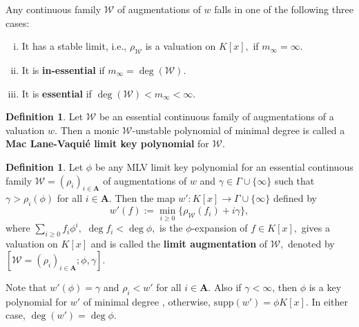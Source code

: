 \documentclass[11pt]{amsart}
\newtheorem{lemma}[theorem]{Lemma}
\theoremstyle{definition}
\newtheorem{definition}[theorem]{Definition}
\theoremstyle{remark}
\newtheorem{remark}[theorem]{Remark}
\numberwithin{equation}{section}
\begin{document}
Any continuous family $\mathcal{W}$ of augmentations of $w$ falls in one of the following three cases:
\begin{enumerate}[(i)]
	\item  It has a stable limit,  i.e., $\rho_{\mathcal{W}}$ is a valuation on $K[x],$ if $m_{\infty}=\infty.$ 
	\item It is {\bf in-essential} if $m_{\infty}=\deg(\mathcal{W}).$
	\item It is  {\bf essential }  if $\deg(\mathcal{W})<m_{\infty}<\infty.$
\end{enumerate} 
\begin{definition}
	Let $\mathcal{W}$ be an essential continuous family of augmentations of a valuation $w.$ Then a  monic $\mathcal{W}$-unstable polynomial of minimal degree  is called a {\bf Mac Lane-Vaqui\'e  limit key polynomial} for $\mathcal{W}.$
\end{definition}
%
%
%
%
%
%
\begin{definition}
	Let   $\phi$ be any MLV limit key polynomial for an essential continuous family $\mathcal{W}  =(\rho_i)_{i\in\mathbf{A}}$ of augmentations of $w$   and  $\gamma\in \Gamma\cup\{\infty\}$ such that $\gamma>\rho_i(\phi)$ for all $i\in\mathbf{A}.$ Then the map $w': K[x]\longrightarrow\Gamma\cup\{\infty\}$ defined by
	$$w'(f):=\min_{i\geq 0}\{\rho_\mathcal{W}(f_i)+i\gamma\},$$
	where  $\sum_{i\geq 0} f_i\phi^i,$ $\deg f_i<\deg \phi,$ is the $\phi$-expansion of $f\in K[x],$ gives a valuation on $K[x]$ and is called  the {\bf limit augmentation} of $\mathcal{W},$  denoted by $[\mathcal{W}=(\rho_i)_{i\in\mathbf{A}}; \phi, \gamma].$ 
\end{definition}
Note that $w'(\phi)=\gamma$ and $\rho_i<w'$ for all $i\in\mathbf{A}.$ Also if $\gamma<\infty$, then $\phi$ is a key polynomial for $w'$ of minimal degree  \cite[Proposition 3.5]{EN1}, otherwise, $\text{supp}(w')=\phi K[x].$ In either case, $\deg (w')=\deg\phi.$ 
\end{document}
